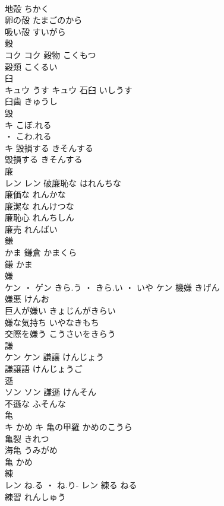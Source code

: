 \documentclass[8pt]{extreport}
\begin{document}
\begin{CJK}{UTF8}{min}
\\	地殻	ちかく	
\\	卵の殻	たまごのから	
\\	吸い殻	すいがら	
\\	穀	
\\	コク		コク	穀物	こくもつ	
\\	穀類	こくるい	
\\	臼	
\\	キュウ	うす	キュウ	石臼	いしうす	
\\	臼歯	きゅうし	
\\	毀	
\\	キ	こぼ.れる
\\	・ こわ.れる
\\	キ	毀損する	きそんする	
\\	毀損する	きそんする	
\\	廉	
\\	レン		レン	破廉恥な	はれんちな	
\\	廉価な	れんかな	
\\	廉潔な	れんけつな	
\\	廉恥心	れんちしん	
\\	廉売	れんばい	
\\	鎌	
\\	かま														鎌倉	かまくら	
\\	鎌	かま	
\\	嫌	
\\	ケン ・ ゲン	きら.う ・ きら.い ・ いや	ケン	機嫌	きげん	
\\	嫌悪	けんお	
\\	巨人が嫌い	きょじんがきらい	
\\	嫌な気持ち	いやなきもち	
\\	交際を嫌う	こうさいをきらう	
\\	謙	
\\	ケン		ケン	謙譲	けんじょう	
\\	謙譲語	けんじょうご	
\\	遜	
\\	ソン		ソン	謙遜	けんそん	
\\	不遜な	ふそんな	
\\	亀	
\\	キ	かめ	キ	亀の甲羅	かめのこうら	
\\	亀裂	きれつ	
\\	海亀	うみがめ	
\\	亀	かめ	
\\	練	
\\	レン	ね.る ・ ね.り-	レン	練る	ねる	
\\	練習	れんしゅう	

\end{CJK}
\end{document}
